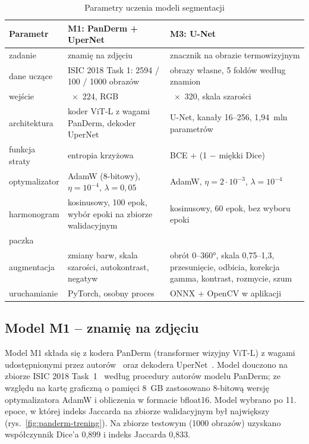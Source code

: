\begin{table}[htbp]
  \centering
  \caption{Parametry uczenia modeli segmentacji}
  \label{tab:uczenie}
  \small
  \begin{tabularx}{\textwidth}{>{\raggedright\arraybackslash}p{2.6cm} >{\raggedright\arraybackslash}X >{\raggedright\arraybackslash}X}
    \toprule
    Parametr & M1: PanDerm + UperNet & M3: U-Net \\
    \midrule
    zadanie & znamię na zdjęciu & znacznik na obrazie termowizyjnym \\
    dane uczące & ISIC 2018 Task 1: 2594 / 100 / 1000 obrazów & 94 obrazy własne, 5 foldów według znamion \\
    wejście & 224~$\times$~224, RGB & 240~$\times$~320, skala szarości \\
    architektura & koder ViT-L z wagami PanDerm, dekoder UperNet & U-Net, kanały 16--256, 1,94~mln parametrów \\
    funkcja straty & entropia krzyżowa & BCE + (1 $-$ miękki Dice) \\
    optymalizator & AdamW (8-bitowy), $\eta = 10^{-4}$, $\lambda = 0{,}05$ & AdamW, $\eta = 2\cdot10^{-3}$, $\lambda = 10^{-4}$ \\
    harmonogram & kosinusowy, 100 epok, wybór epoki na zbiorze walidacyjnym & kosinusowy, 60 epok, bez wyboru epoki \\
    paczka & 2 & 8 \\
    augmentacja & zmiany barw, skala szarości, autokontrast, negatyw & obrót 0--360°, skala 0,75--1,3, przesunięcie, odbicia, korekcja gamma, kontrast, rozmycie, szum \\
    uruchamianie & PyTorch, osobny proces & ONNX + OpenCV w aplikacji \\
    \bottomrule
  \end{tabularx}
\end{table}

\subsection{Model M1 -- znamię na zdjęciu}

Model M1 składa się z kodera PanDerm (transformer wizyjny ViT-L) z wagami udostępnionymi przez autorów~\cite{yan2025panderm} oraz dekodera UperNet~\cite{xiao2018upernet}. Model douczono na zbiorze ISIC 2018 Task~1~\cite{codella2019} według procedury autorów modelu PanDerm; ze względu na kartę graficzną o pamięci 8~GB zastosowano 8-bitową wersję optymalizatora AdamW i obliczenia w formacie bfloat16. Model wybrano po 11. epoce, w której indeks Jaccarda na zbiorze walidacyjnym był największy (rys.~\ref{fig:panderm-trening}). Na zbiorze testowym (1000 obrazów) uzyskano współczynnik Dice'a 0,899 i indeks Jaccarda 0,833.

